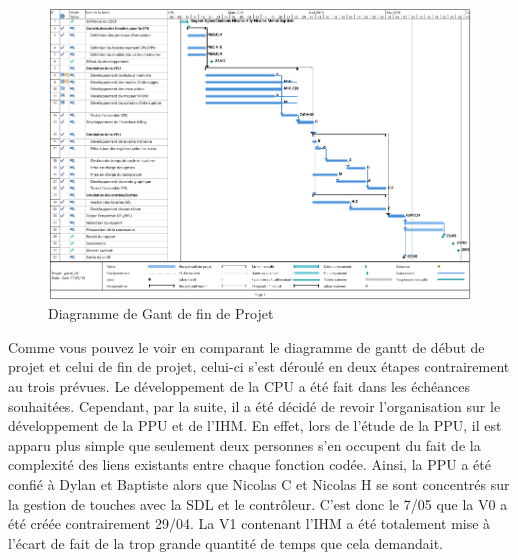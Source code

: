 \begin{figure}[h]
  \centering
   \includegraphics[scale=0.45]{GantV2.png}
   \caption{\label{étiquette} Diagramme de Gant de fin de Projet}
\end{figure}

Comme vous pouvez le voir en comparant le diagramme de gantt de début de projet et celui de fin de projet, celui-ci s'est déroulé en deux étapes contrairement au trois prévues. Le développement de la CPU a été fait dans les échéances souhaitées. Cependant, par la suite, il a été décidé de revoir l'organisation sur le développement de la PPU et de l'IHM. En effet, lors de l'étude de la PPU, il est apparu plus simple que seulement deux personnes s'en occupent du fait de la complexité des liens existants entre chaque fonction codée. Ainsi, la PPU a été confié à Dylan et Baptiste alors que Nicolas C et Nicolas H se sont concentrés sur la gestion de touches avec la SDL et le contrôleur. C'est donc le 7/05 que la V0 a été créée contrairement 29/04. La V1 contenant l'IHM a été totalement mise à l'écart de fait de la trop grande quantité de temps que cela demandait.
